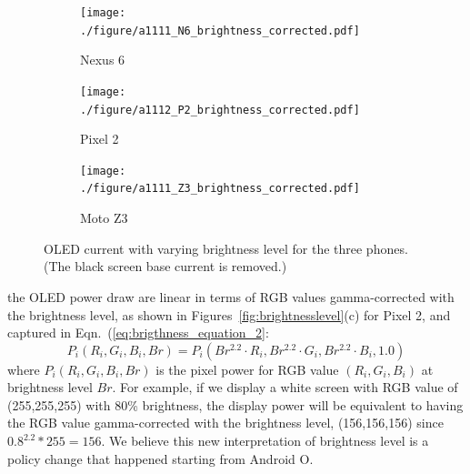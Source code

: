 
\begin{figure}[tp]
	\begin{subfigure}[]{0.31\textwidth}
		\texttt{[image: ./figure/a1111\_N6\_brightness\_corrected.pdf]}
		\caption{Nexus 6}
		\label{fig:brightnesss_phones_n6}
	\end{subfigure}
	\hfill
	\begin{subfigure}[]{0.31\textwidth}
		\texttt{[image: ./figure/a1112\_P2\_brightness\_corrected.pdf]}
		\caption{Pixel 2}
	\end{subfigure}
	\hfill
	\begin{subfigure}[]{0.31\textwidth}
		\texttt{[image: ./figure/a1111\_Z3\_brightness\_corrected.pdf]}
		\caption{Moto Z3}
	\end{subfigure}
        \vspace{-0.1in}
	\caption{OLED current with varying brightness level for the three phones.
		(The black screen base current is removed.)}
	\label{fig:brightnesss_phones}
\end{figure}
\fi

the OLED power draw are linear in terms of RGB values gamma-corrected
with the brightness level,
as shown in Figures~\ref{fig:brightnesslevel}(c) for Pixel 2,
and captured in Eqn.~(\ref{eq:brigthness_equation_2}:
\begin{equation}
  P_i(R_i, G_i, B_i, Br) = P_i( Br^{2.2}\cdot R_i, Br^{2.2}\cdot G_i, Br^{2.2}\cdot B_i, 1.0)
  \label{eq:brigthness_equation_2}
\end{equation}
where
$P_i(R_i, G_i, B_i, Br)$ is the pixel power
for RGB value $(R_i, G_i,B_i)$ at brightness level $Br$.
For example, if we
display a white screen with RGB value of (255,255,255) with 80\%
brightness, the display power will be equivalent to having the RGB
value gamma-corrected with the brightness level, \ie (156,156,156)
since $0.8^{2.2}*255=156$. We believe this new
  interpretation of brightness level is a policy change 
that happened starting from {Android O}.
  \fi

